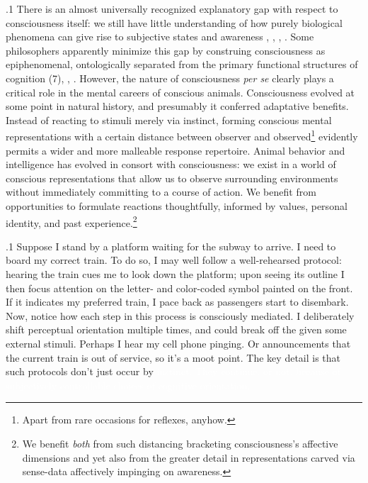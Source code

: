 \documentclass[11pt, twocolumn]{article}
\begin{document}
\p.1{%
There is an almost universally recognized explanatory gap with respect
to consciousness itself: we still have little understanding of
how purely biological phenomena can give rise to subjective
 states and awareness , ,
, . Some philosophers
apparently minimize this gap by construing consciousness as epiphenomenal,
ontologically \pgl{}separated from the primary functional structures
of cognition (7), ,
. However, the
nature of consciousness \textit{per se} clearly
plays a critical role in the mental careers of conscious animals.
Consciousness evolved at some point in natural history, and presumably
it conferred adaptative benefits. Instead of reacting to stimuli
merely via instinct, forming conscious mental representations
\mdash{} with a certain distance between observer and
observed\footnote{Apart from rare occasions for
 reflexes, anyhow.} \mdash{}
evidently permits a wider and more malleable response
repertoire. Animal behavior and intelligence
has evolved in consort with consciousness: we exist in a world
of conscious representations that allow us to observe
surrounding environments without immediately committing to a
course of action. We benefit
from opportunities to formulate reactions thoughtfully, informed
by values, personal identity, and past experience.\footnote{We benefit
\textit{both} from \label{fn:benefit}such
distancing \mdash{} bracketing consciousness's affective
dimensions \mdash{} and yet also from the greater detail in
representations carved via sense-data affectively
impinging on awareness.}\condenlargepage{1em}
}%

\p.1{%
Suppose I stand by a platform waiting for the subway to arrive. I need to board
my correct train. To do so, I may well follow a well-rehearsed
protocol: hearing the train cues me to look down the platform; upon seeing
its outline I then focus attention on the letter- and color-coded
symbol painted on the front. If it indicates my preferred train,
I pace back as passengers start to disembark. Now, notice how each step in this process is consciously mediated.
I deliberately shift perceptual orientation multiple
times, and could break off the  given some external
stimuli. Perhaps I hear my cell phone pinging. Or announcements
that the current train is out of service, so it's a moot point. The key
detail is that such protocols don't just occur by
\textcolor{white}{instinct. They continue,
or not, because of subjectively controllable choices of cognitive orientation.}
}%
\end{document}

